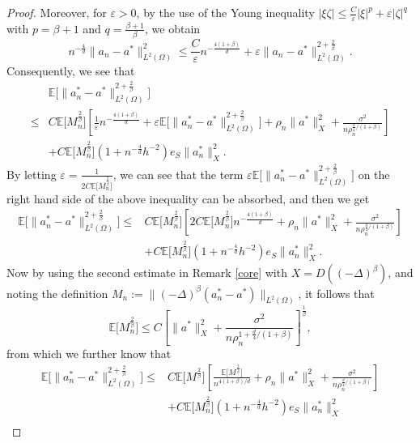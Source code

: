 \documentclass[11pt]{article}
\numberwithin{equation}{section}
\begin{document}
\begin{proof}
Moreover, for $\varepsilon>0$, by the use of the Young inequality $|\xi\zeta| \le \frac{C}{\varepsilon} |\xi|^p + \varepsilon |\zeta|^q$ with $p=\beta+1$ and $q=\frac{\beta+1}{\beta}$, we obtain
\[
 n^{-\frac4d}\|a_n - a^* \|^2_{L^2(\Omega)}  \le \frac{C}{\varepsilon}n^{-\frac{4(1+\beta)}d} + \varepsilon \|a_n - a^* \|^{2+\frac2\beta}_{L^2(\Omega)}.
\]
Consequently, we see that
\[
\begin{aligned}
&\mathbb{E} \bigl[ \| a_n^* - a^* \|^{2+\frac{2}{\beta}}_{L^2(\Omega)} \bigr] \\
\le&  C\mathbb{E} \bigl[M_n^{\frac2\beta} \bigr] \left[ \frac{1}{\varepsilon}n^{-\frac{4(1+\beta)}d}  + \varepsilon \mathbb{E} \bigl[\|a_n^* - a^* \|^{2+\frac2\beta}_{L^2(\Omega)} \bigr] +  \rho_n \| a^* \|^2_{X} +  \frac{\sigma^2}{n \rho_n^{\frac{d}{4}/(1+\beta)}} \right]\\
&+C\mathbb{E}\bigl[M_n^{\frac2\beta} \bigr]\left(1+n^{-\frac4d}h^{-2}\right)e_S\|a_n^*\|^2_X.
\end{aligned}
\]
By letting $\varepsilon=\frac1{2C\mathbb{E} \bigl[M_n^{\frac2\beta} \bigr]}$, we can see that the term  $\varepsilon\mathbb{E} \bigl[\|a_n^* - a^* \|^{2+\frac2\beta}_{L^2(\Omega)} \bigr]$ on the right hand side of the above inequality can be absorbed, and then we get
\[
\begin{aligned}
\mathbb{E} \bigl[ \| a_n^* - a^* \|^{2+\frac{2}{\beta}}_{L^2(\Omega)} \bigr] 
\le & C\mathbb{E} \bigl[M_n^{\frac2\beta} \bigr] \left[ 2C\mathbb{E} \bigl[M_n^{\frac2\beta} \bigr] n^{-\frac{4(1+\beta)}d}  +  \rho_n \| a^* \|^2_{X} +  \frac{\sigma^2}{n \rho_n^{\frac{d}{4}/(1+\beta)}} \right]\\
&+C\mathbb{E}\bigl[M_n^{\frac2\beta} \bigr]\left(1+n^{-\frac4d}h^{-2}\right)e_S\|a_n^*\|^2_X.
\end{aligned}
\]
Now by using the second estimate in Remark \ref{core} with $X=D((-\Delta)^\beta)$, and noting the definition $M_n:=\|(-\Delta)^\beta (a_n^* - a^*)\|_{L^2(\Omega)}$, it follows that
$$
\mathbb{E} \bigl[M_n^{\frac2\beta} \bigr] \le C\left[ \| a^* \|^2_{X} + \frac{\sigma^2}{n \rho_n^{1 + \frac{d}4/(1+\beta)}}\right]^{\frac1\beta},
$$
from which we further know that
\[
\begin{aligned}
\mathbb{E} \bigl[ \| a_n^* - a^* \|^{2+\frac{2}{\beta}}_{L^2(\Omega)} \bigr] 
\le&  C\mathbb{E} \bigl[M^{\frac2\beta} \bigr] \left[ \frac{\mathbb{E} \bigl[M^{\frac2\beta} \bigr]}{n^{4(1+\beta)/d}}  +  \rho_n \| a^* \|^2_{X} +  \frac{\sigma^2}{n \rho_n^{\frac{d}{4}/(1+\beta)}} \right]\\
&+C\mathbb{E}\bigl[M_n^{\frac2\beta} \bigr]\left(1+n^{-\frac4d}h^{-2}\right)e_S\|a_n^*\|^2_X\\

\end{aligned}\]
\end{proof}
\end{document}
